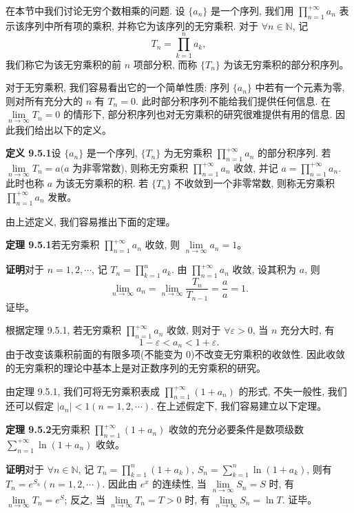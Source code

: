 \documentclass[UTF8, 12pt, fontset=fandol, oneside]{ctexart}
\begin{document}
在本节中我们讨论无穷个数相乘的问题. 设 $\{a_n\}$ 是一个序列, 我们用 $\prod\limits_{n=1}^{+\infty}a_n$ 表示该序列中所有项的乘积, 并称它为该序列的无穷乘积. 对于 $\forall n\in\mathbb{N}$, 记
\[
  T_n=\prod_{k=1}^n a_k,
\]
我们称它为该无穷乘积的前 $n$ 项部分积, 而称 $\{T_n\}$ 为该无穷乘积的部分积序列。

对于无穷乘积, 我们容易看出它的一个简单性质: 序列 $\{a_n\}$ 中若有一个元素为零, 则对所有充分大的 $n$ 有 $T_n=0$. 此时部分积序列不能给我们提供任何信息. 在 $\lim\limits_{n\to\infty}T_n=0$ 的情形下, 部分积序列也对无穷乘积的研究很难提供有用的信息. 因此我们给出以下的定义。

\noindent\textbf{定义 9.5.1}\quad 设 $\{a_n\}$ 是一个序列, $\{T_n\}$ 为无穷乘积 $\prod\limits_{n=1}^{+\infty}a_n$ 的部分积序列. 若 $\lim\limits_{n\to\infty}T_n=a(a$ 为非零常数), 则称无穷乘积 $\prod\limits_{n=1}^{+\infty}a_n$ 收敛, 并记 $a=\prod\limits_{n=1}^{+\infty}a_n$. 此时也称 $a$ 为该无穷乘积的积. 若 $\{T_n\}$ 不收敛到一个非零常数, 则称无穷乘积 $\prod\limits_{n=1}^{+\infty}a_n$ 发散。

由上述定义, 我们容易推出下面的定理。

\noindent\textbf{定理 9.5.1}\quad 若无穷乘积 $\prod\limits_{n=1}^{+\infty}a_n$ 收敛, 则 $\lim\limits_{n\to\infty}a_n=1$。

\noindent\textbf{证明}\quad 对于 $n=1,2,\cdots$, 记 $T_n=\prod\limits_{k=1}^n a_k$. 由 $\prod\limits_{n=1}^{+\infty}a_n$ 收敛, 设其积为 $a$, 则
\[
  \lim_{n\to\infty}a_n=\lim_{n\to\infty}\frac{T_n}{T_{n-1}}=\frac{a}{a}=1.
\]
证毕。

根据定理 9.5.1, 若无穷乘积 $\prod\limits_{n=1}^{+\infty}a_n$ 收敛, 则对于 $\forall\varepsilon>0$, 当 $n$ 充分大时, 有
\[
  1-\varepsilon<a_n<1+\varepsilon.
\]
由于改变该乘积前面的有限多项(不能变为 0)不改变无穷乘积的收敛性. 因此收敛的无穷乘积的理论中基本上是对正数序列的无穷乘积的研究。

由定理 9.5.1, 我们可将无穷乘积表成 $\prod\limits_{n=1}^{+\infty}(1+a_n)$ 的形式, 不失一般性, 我们还可以假定 $|a_n|<1(n=1,2,\cdots)$. 在上述假定下, 我们容易建立以下定理。

\noindent\textbf{定理 9.5.2}\quad 无穷乘积 $\prod\limits_{n=1}^{+\infty}(1+a_n)$ 收敛的充分必要条件是数项级数 $\sum\limits_{n=1}^{+\infty}\ln(1+a_n)$ 收敛。

\noindent\textbf{证明}\quad 对于 $\forall n\in\mathbb{N}$, 记 $T_n=\prod\limits_{k=1}^n(1+a_k)$, $S_n=\sum\limits_{k=1}^n\ln(1+a_k)$, 则有 $T_n=e^{S_n}(n=1,2,\cdots)$. 因此由 $e^x$ 的连续性, 当 $\lim\limits_{n\to\infty}S_n=S$ 时, 有 $\lim\limits_{n\to\infty}T_n=e^S$; 反之, 当 $\lim\limits_{n\to\infty}T_n=T>0$ 时, 有 $\lim\limits_{n\to\infty}S_n=\ln T$. 证毕。
\end{document}
